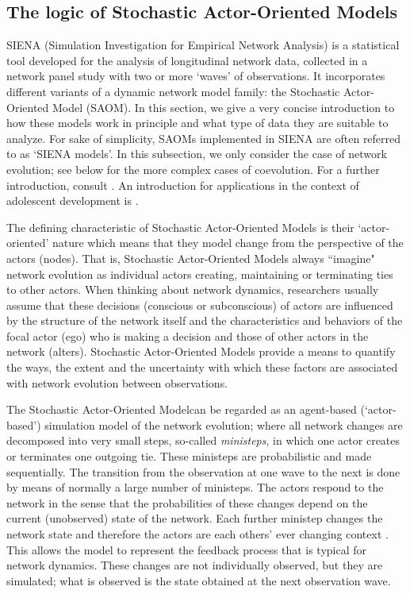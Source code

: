 \documentclass[a4paper,fleqn,11pt]{article}
\newcommand{\+}{\, + \,}
\newcommand{\SI}{{\sf SIENA }}
\newcommand{\SAOM}{{Stochastic Actor-Oriented Model }}
\newcommand{\saom}{{Stochastic Actor-Oriented Model}}
\begin{document}
\subsection{The logic of {\saom}s}
\label{S_logic}

\SI (Simulation Investigation for Empirical Network Analysis) is a
statistical tool developed for the analysis of longitudinal network data,
collected in a network panel study with two or more `waves' of observations.
It incorporates different variants of a dynamic network model family:
the \SAOM (SAOM). In this section, we give
a very concise introduction to how these models work in principle and what
type of data they are suitable to analyze. For sake of simplicity,
SAOMs implemented in \SI are often referred to as `\SI models'.
In this subsection, we only consider the case of network evolution;
see below for the more complex cases of coevolution.
For a further introduction, consult  \citet{SnijdersEA10b}.
An introduction for applications in the context of adolescent
development is \citet{VeenstraEtAl2013}.

The defining characteristic of {\saom}s
is their `actor-oriented' nature which means that they model
change from the perspective of the actors (nodes).
That is, {\saom}s always ``imagine" network evolution
as individual actors creating, maintaining or terminating ties to other actors.
When thinking about network dynamics, researchers usually assume that these
decisions (conscious or subconscious) of actors are influenced by the structure
of the network itself and the characteristics and behaviors of the focal actor
(ego) who is making a decision and those of other actors in the network (alters).
{\saom}s provide a means to quantify the ways, the
extent and the uncertainty with which these factors are associated with
network evolution between observations.

The \saom can be regarded as an agent-based (`actor-based') simulation
model of the network evolution; where all network changes are decomposed into
very small steps, so-called \emph{ministeps}, in which
one actor creates or terminates one outgoing tie.
These ministeps are probabilistic and made sequentially.
The transition from the observation
at one wave to the next is done by means of normally a large number of ministeps.
The actors respond to the network in the sense that the probabilities
of these changes depend on the current (unobserved) state of the network.
Each further ministep changes the network state and therefore the actors
are each others' ever changing context  \citep{Zeg94}.
This allows the model to represent the feedback process
that is typical for network dynamics. These changes are not
individually observed, but they are simulated;
what is observed is the state obtained at the next observation wave.
\end{document}
